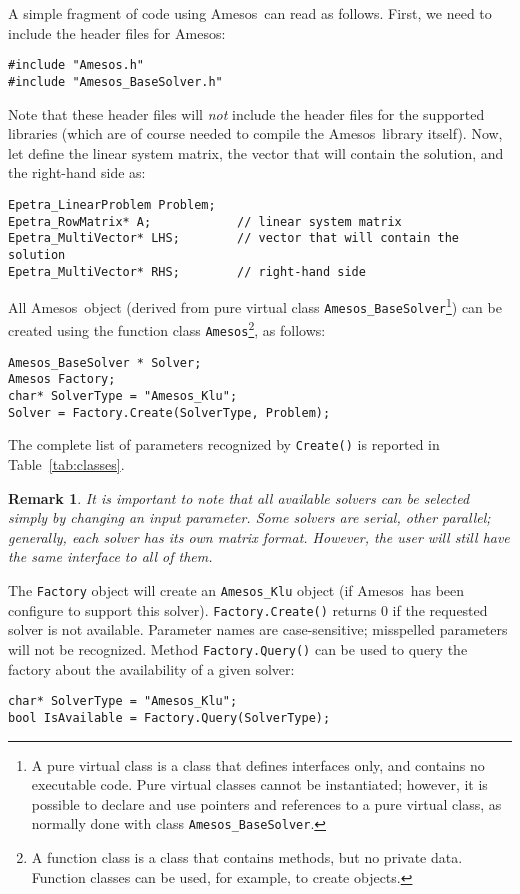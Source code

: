 \documentclass[11pt]{SANDreport}
\newcommand{\amesos}{{\sc Amesos}}
\newtheorem{remark}{Remark}
\begin{document}
A simple fragment of code using \amesos\ can read as follows. First,
  we need to include the header files for \amesos:
\begin{verbatim}
#include "Amesos.h"
#include "Amesos_BaseSolver.h"
\end{verbatim}
Note that these header files will {\sl not} include the header files
for the supported libraries (which are of course needed to compile the
\amesos\ library itself). Now, let define the linear system matrix, the
vector that will contain the solution, and the right-hand side as:
\begin{verbatim}
Epetra_LinearProblem Problem;
Epetra_RowMatrix* A;            // linear system matrix
Epetra_MultiVector* LHS;        // vector that will contain the solution
Epetra_MultiVector* RHS;        // right-hand side
\end{verbatim}

All \amesos\ object (derived from pure virtual class 
\verb!Amesos_BaseSolver!\footnote{A pure virtual class is a class that
defines interfaces only, and contains no executable code. Pure virtual classes cannot
be instantiated; however, it is possible to declare and use pointers and
references to a pure virtual class, as normally done with class
{\tt Amesos\_BaseSolver}.})
can be created using the function class \verb!Amesos!\footnote{A function
class is a class that contains methods, but no private data. Function
classes can be used, for example, to create objects.}, as follows:
\begin{verbatim}
Amesos_BaseSolver * Solver;
Amesos Factory;
char* SolverType = "Amesos_Klu";
Solver = Factory.Create(SolverType, Problem);
\end{verbatim}
The complete list of parameters recognized by \verb!Create()! is reported
in Table~\ref{tab:classes}.

\begin{remark}
It is important to note that all available solvers can be selected
simply by changing an input parameter. Some solvers are serial, other
parallel; generally, each solver has its own matrix format. However, the
user will still have the {\em same} interface to all of them.
\end{remark}

The \verb!Factory! object will create an \verb!Amesos_Klu! object (if \amesos\
has been configure to support this solver). \verb!Factory.Create()! 
returns 0 if the requested solver is not available. Parameter names 
are case-sensitive; misspelled parameters 
will not be recognized. Method
\verb!Factory.Query()! can be used to query the factory about the
availability of a given solver:
\begin{verbatim}
char* SolverType = "Amesos_Klu";
bool IsAvailable = Factory.Query(SolverType);
\end{verbatim}
\end{document}
